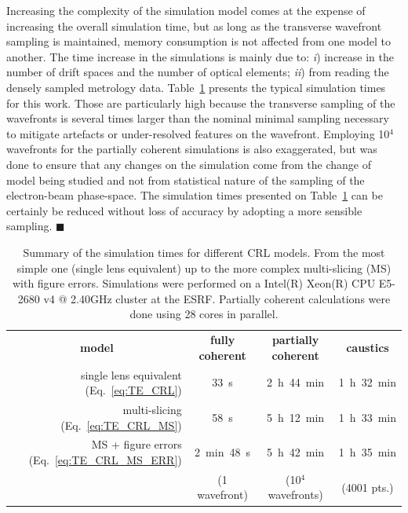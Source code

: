 \begin{refsection}
Increasing the complexity of the simulation model comes at the expense of increasing the overall simulation time, but as long as the transverse wavefront sampling is maintained, memory consumption is not affected from one model to another. The time increase in the simulations is mainly due to: \textit{i}) increase in the number of drift spaces and the number of optical elements; \textit{ii}) from reading the densely sampled metrology data. Table~\ref{tab:simulation_time} presents the typical simulation times for this work. Those are particularly high because the transverse sampling of the wavefronts is several times larger than the nominal minimal sampling necessary to mitigate artefacts or under-resolved features on the wavefront. Employing 10$^{4}$ wavefronts for the partially coherent simulations is also exaggerated, but was done to ensure that any changes on the simulation come from the change of model being studied and not from statistical nature of the sampling of the electron-beam phase-space. The simulation times presented on Table~\ref{tab:simulation_time} can be certainly be reduced without loss of accuracy by adopting a more sensible sampling. $\blacksquare$

\begin{table}[t]
\caption[Summary of the simulation times for different CRL models]{Summary of the simulation times for different CRL models. From the most simple one (single lens equivalent) up to the more complex multi-slicing (MS) with figure errors. Simulations were performed on a Intel(R) Xeon(R) CPU E5-2680 v4 @ 2.40GHz cluster at the ESRF. Partially coherent calculations were done using 28 cores in parallel.}\label{tab:simulation_time}\small
\centering
\begin{tabular}{rccc}\hline\hline
\multicolumn{1}{c}{\textbf{model}} & \textbf{fully coherent} &\textbf{ partially coherent} & \textbf{caustics}\\\cline{1-4}
single lens equivalent (Eq.~\ref{eq:TE_CRL})                 &33~s            &2~h~44~min  &1~h~32~min               \\
multi-slicing  (Eq.~\ref{eq:TE_CRL_MS})                     &58~s            &5~h~12~min  &1~h~33~min               \\
MS + figure errors  (Eq.~\ref{eq:TE_CRL_MS_ERR})                &2~min~48~s      &5~h~42~min  &1~h~35~min               \\\cline{2-4}
\multicolumn{1}{c}{}               & (1 wavefront)  & (10$^{4}$ wavefronts)  & (4001 pts.) \\\hline\hline
\end{tabular}
\end{table}











\printbibliography[heading=subbibliography]
\end{refsection}

